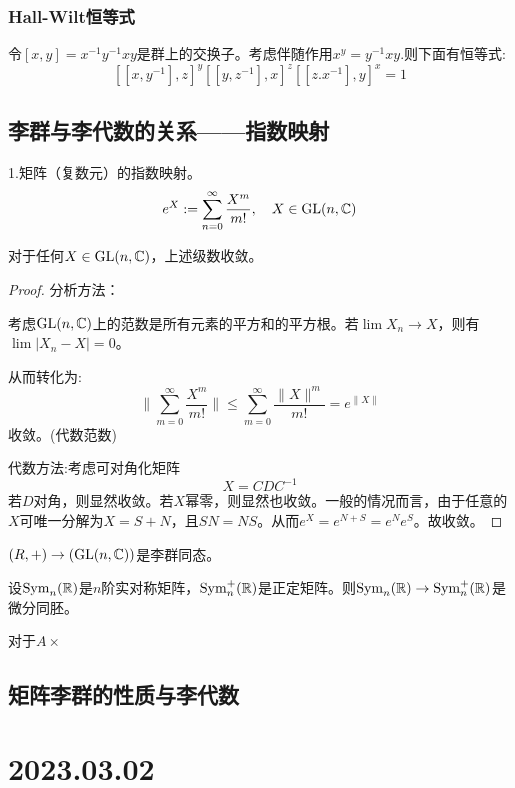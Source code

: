 \subsection{Hall-Wilt恒等式}
令$[x,y]=x^{-1}y^{-1}xy$是群上的交换子。考虑伴随作用$x^y=y^{-1}xy$.则下面有恒等式:
$$
[[x,y^{-1}],z]^y[[y,z^{-1}],x]^z[[z.x^{-1}],y]^x=1
$$
\begin{example}
    
\end{example}
\section{李群与李代数的关系——指数映射}
1.矩阵（复数元）的指数映射。
$$
e^X:=\sum_{n=0}^\infty \frac{X^m}{m!}, \quad X \in \mathrm{GL}(n,\mathbb{C})
$$

\begin{proposition}
     对于任何$X \in \mathrm{GL}(n,\mathbb{C})$，上述级数收敛。    
\end{proposition}
\begin{proof}
    分析方法：

    考虑$\mathrm{GL}(n,\mathbb{C})$上的范数是所有元素的平方和的平方根。若$\lim X_n \to X$，则有$\lim |X_n -X|=0$。

    从而转化为:
    $$
    \|\sum_{m=0}^\infty \frac{X^m}{m!}\| \leq \sum_{m=0}^\infty \frac{\|X\|^m}{m!}=e^{\|X\|}
    $$
    收敛。(代数范数)

    代数方法:考虑可对角化矩阵
    $$
    X=CDC^{-1}
    $$
    若$D$对角，则显然收敛。若$X$幂零，则显然也收敛。一般的情况而言，由于任意的$X$可唯一分解为$X=S+N$，且$SN=NS$。从而$e^X=e^{N+S}=e^N e^S$。故收敛。
\end{proof}
$(R,+) \to (\mathrm{GL}(n,\mathbb{C}))$是李群同态。

\begin{lemma}
    
    设$\mathrm{Sym}_n(\mathbb{R})$是$n$阶实对称矩阵，$\mathrm{Sym}_n^+(\mathbb{R})$是正定矩阵。则$\mathrm{Sym}_n(\mathbb{R}) \to \mathrm{Sym}_n^+(\mathbb{R})$是微分同胚。
\end{lemma}

\begin{proposition}
    对于$A \times $
\end{proposition}

\section{矩阵李群的性质与李代数}
\chapter{2023.03.02}
